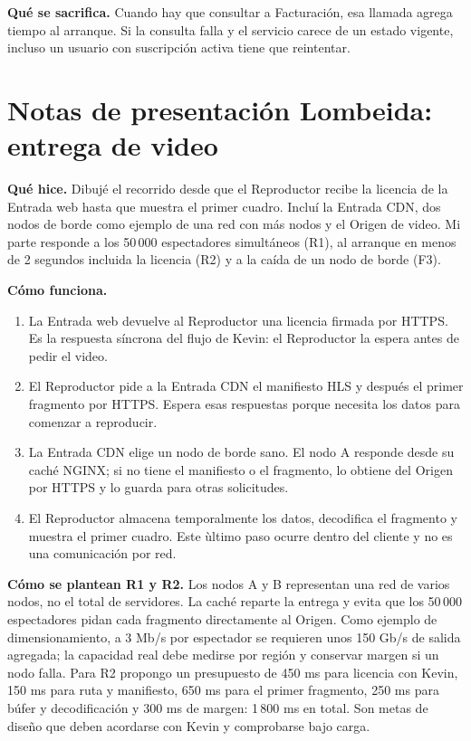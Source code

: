 \documentclass[11pt,a4paper]{article}
\begin{document}
	\textbf{Qu\'e se sacrifica.} Cuando hay que consultar a Facturaci\'on, esa llamada agrega tiempo al arranque. Si la consulta falla y el servicio carece de un estado vigente, incluso un usuario con suscripci\'on activa tiene que reintentar.
	
	\section*{Notas de presentaci\'on Lombeida: entrega de video}
	\textbf{Qu\'e hice.} Dibuj\'e el recorrido desde que el Reproductor recibe la licencia de la Entrada web hasta que muestra el primer cuadro. Inclu\'i la Entrada CDN, dos nodos de borde como ejemplo de una red con m\'as nodos y el Origen de video. Mi parte responde a los 50\,000 espectadores simult\'aneos (R1), al arranque en menos de 2 segundos incluida la licencia (R2) y a la ca\'ida de un nodo de borde (F3).

	\textbf{C\'omo funciona.}
	\begin{enumerate}[leftmargin=*,itemsep=2pt]
		\item La Entrada web devuelve al Reproductor una licencia firmada por HTTPS. Es la respuesta s\'incrona del flujo de Kevin: el Reproductor la espera antes de pedir el video.
		\item El Reproductor pide a la Entrada CDN el manifiesto HLS y despu\'es el primer fragmento por HTTPS. Espera esas respuestas porque necesita los datos para comenzar a reproducir.
		\item La Entrada CDN elige un nodo de borde sano. El nodo A responde desde su cach\'e NGINX; si no tiene el manifiesto o el fragmento, lo obtiene del Origen por HTTPS y lo guarda para otras solicitudes.
		\item El Reproductor almacena temporalmente los datos, decodifica el fragmento y muestra el primer cuadro. Este \`ultimo paso ocurre dentro del cliente y no es una comunicaci\'on por red.
	\end{enumerate}

	\textbf{C\'omo se plantean R1 y R2.} Los nodos A y B representan una red de varios nodos, no el total de servidores. La cach\'e reparte la entrega y evita que los 50\,000 espectadores pidan cada fragmento directamente al Origen. Como ejemplo de dimensionamiento, a 3 Mb/s por espectador se requieren unos 150 Gb/s de salida agregada; la capacidad real debe medirse por regi\'on y conservar margen si un nodo falla. Para R2 propongo un presupuesto de 450 ms para licencia con Kevin, 150 ms para ruta y manifiesto, 650 ms para el primer fragmento, 250 ms para b\'ufer y decodificaci\'on y 300 ms de margen: 1\,800 ms en total. Son metas de dise\~no que deben acordarse con Kevin y comprobarse bajo carga.
\end{document}
